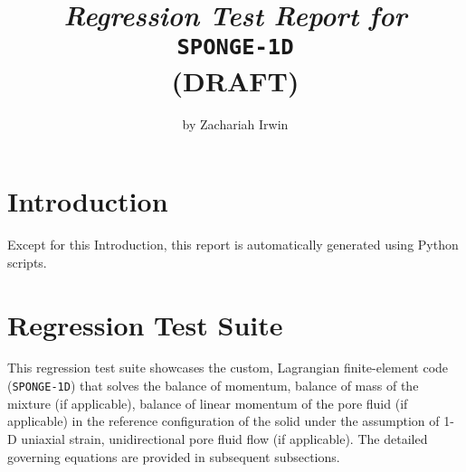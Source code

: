 \documentclass[12pt,letterpaper]{article}
\begin{document}
\title{{\small{\it Regression Test Report for}}  \\ \texttt{SPONGE-1D} \\(DRAFT)}

\author{{by} Zachariah Irwin}

\maketitle
\titlepage
\tableofcontents




\section{Introduction}

Except for this Introduction, this report is automatically generated using
Python scripts.

\section{Regression Test Suite}
This regression test suite showcases the custom, Lagrangian finite-element code (\texttt{SPONGE-1D}) that solves the balance of momentum, balance of mass of the mixture (if applicable), balance of linear momentum of the pore fluid (if applicable) in the reference configuration of the solid under the assumption of 1-D uniaxial strain, unidirectional pore fluid flow (if applicable). The detailed governing equations are provided in subsequent subsections.


\clearpage


\end{document}
